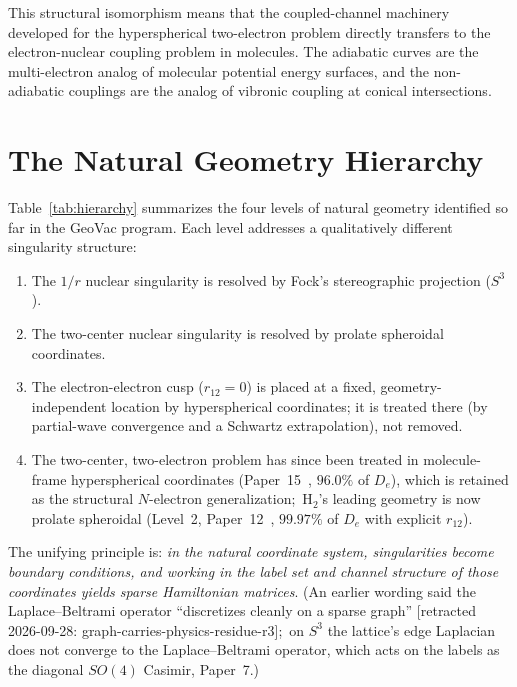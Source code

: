 \documentclass[aps,pra,twocolumn,superscriptaddress,longbibliography]{revtex4-2}
\begin{document}
This structural isomorphism means that the coupled-channel machinery
developed for the hyperspherical two-electron problem directly
transfers to the electron-nuclear coupling problem in molecules.
The adiabatic curves are the multi-electron analog of molecular
potential energy surfaces, and the non-adiabatic couplings are the
analog of vibronic coupling at conical intersections.


\section{The Natural Geometry Hierarchy}
\label{sec:hierarchy}

Table~\ref{tab:hierarchy} summarizes the four levels of natural
geometry identified so far in the GeoVac program.  Each level
addresses a qualitatively different singularity structure:

\begin{enumerate}
  \item The $1/r$ nuclear singularity is resolved by Fock's
    stereographic projection ($S^3$).
  \item The two-center nuclear singularity is resolved by prolate
    spheroidal coordinates.
  \item The electron-electron cusp ($r_{12} = 0$) is placed at a fixed,
    geometry-independent location by hyperspherical coordinates; it is
    treated there (by partial-wave convergence and a Schwartz
    extrapolation), not removed.
  \item The two-center, two-electron problem has since been treated in
    molecule-frame hyperspherical coordinates (Paper~15~\cite{loutey_paper15},
    $96.0\%$ of $D_e$), which is retained as the structural $N$-electron
    generalization;\ H$_2$'s leading geometry is now prolate spheroidal
    (Level~2, Paper~12~\cite{loutey_paper12}, $99.97\%$ of $D_e$ with
    explicit $r_{12}$).
\end{enumerate}

The unifying principle is: \emph{in the natural coordinate system,
singularities become boundary conditions, and working in the label set
and channel structure of those coordinates yields sparse Hamiltonian
matrices}.  (An earlier wording said the Laplace--Beltrami operator
``discretizes cleanly on a sparse graph'' [retracted 2026-09-28: graph-carries-physics-residue-r3];\ on $S^3$ the lattice's edge
Laplacian does not converge to the Laplace--Beltrami operator, which acts
on the labels as the diagonal $SO(4)$ Casimir, Paper~7.)
\end{document}
